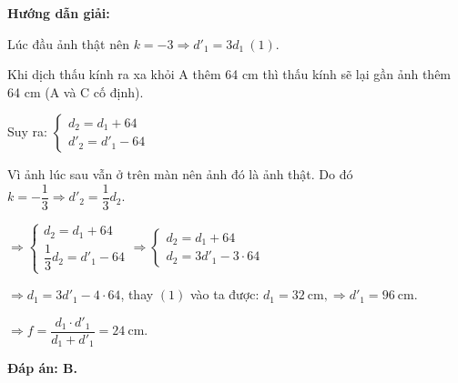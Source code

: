 {
\begin{center}
	\textbf{Hướng dẫn giải:}
\end{center}

{Lúc đầu ảnh thật nên $k=-3\Rightarrow d'_1=3d_1\ (1)$.
	
	Khi dịch thấu kính ra xa khỏi A thêm 64 cm thì thấu kính sẽ lại gần ảnh thêm 64 cm (A và C cố định). 
	
	Suy ra: 
	$\begin{cases} d_2=d_1+64 \\ d'_2=d'_1-64\end{cases}$
	
	Vì ảnh lúc sau vẫn ở trên màn nên ảnh đó là ảnh thật. Do đó $k=-\dfrac{1}{3}\Rightarrow d'_2=\dfrac{1}{3}d_2$.
	
	$\Rightarrow \begin{cases} d_2=d_1+64 \\ \dfrac{1}{3}d_2=d'_1-64\end{cases}\Rightarrow \begin{cases} d_2=d_1+64 \\ d_2=3d'_1-3\cdot 64\end{cases}$
	
	$\Rightarrow d_1=3d'_1-4\cdot 64$, thay $(1)$ vào ta được:
	$d_1=32\ \text{cm}, \Rightarrow d'_1=96\ \text{cm}$.
	
	$\Rightarrow f=\dfrac{d_1\cdot d'_1}{d_1+d'_1}=24\ \text{cm}$.
	
\textbf{	Đáp án: B.}
} 

}